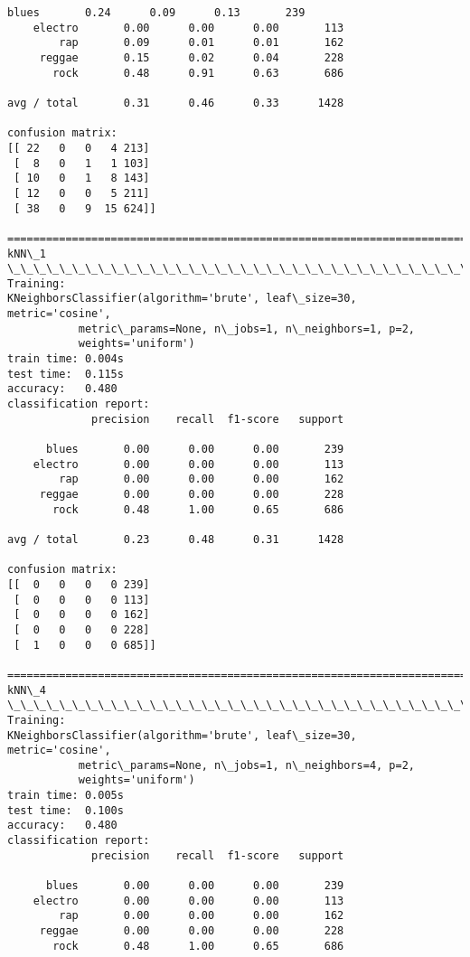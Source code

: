 \documentclass[11pt]{article}
\begin{document}
\begin{Verbatim}[commandchars=\\\{\}]
      blues       0.24      0.09      0.13       239
    electro       0.00      0.00      0.00       113
        rap       0.09      0.01      0.01       162
     reggae       0.15      0.02      0.04       228
       rock       0.48      0.91      0.63       686

avg / total       0.31      0.46      0.33      1428

confusion matrix:
[[ 22   0   0   4 213]
 [  8   0   1   1 103]
 [ 10   0   1   8 143]
 [ 12   0   0   5 211]
 [ 38   0   9  15 624]]

================================================================================
kNN\_1
\_\_\_\_\_\_\_\_\_\_\_\_\_\_\_\_\_\_\_\_\_\_\_\_\_\_\_\_\_\_\_\_\_\_\_\_\_\_\_\_\_\_\_\_\_\_\_\_\_\_\_\_\_\_\_\_\_\_\_\_\_\_\_\_\_\_\_\_\_\_\_\_\_\_\_\_\_\_\_\_
Training: 
KNeighborsClassifier(algorithm='brute', leaf\_size=30, metric='cosine',
           metric\_params=None, n\_jobs=1, n\_neighbors=1, p=2,
           weights='uniform')
train time: 0.004s
test time:  0.115s
accuracy:   0.480
classification report:
             precision    recall  f1-score   support

      blues       0.00      0.00      0.00       239
    electro       0.00      0.00      0.00       113
        rap       0.00      0.00      0.00       162
     reggae       0.00      0.00      0.00       228
       rock       0.48      1.00      0.65       686

avg / total       0.23      0.48      0.31      1428

confusion matrix:
[[  0   0   0   0 239]
 [  0   0   0   0 113]
 [  0   0   0   0 162]
 [  0   0   0   0 228]
 [  1   0   0   0 685]]

================================================================================
kNN\_4
\_\_\_\_\_\_\_\_\_\_\_\_\_\_\_\_\_\_\_\_\_\_\_\_\_\_\_\_\_\_\_\_\_\_\_\_\_\_\_\_\_\_\_\_\_\_\_\_\_\_\_\_\_\_\_\_\_\_\_\_\_\_\_\_\_\_\_\_\_\_\_\_\_\_\_\_\_\_\_\_
Training: 
KNeighborsClassifier(algorithm='brute', leaf\_size=30, metric='cosine',
           metric\_params=None, n\_jobs=1, n\_neighbors=4, p=2,
           weights='uniform')
train time: 0.005s
test time:  0.100s
accuracy:   0.480
classification report:
             precision    recall  f1-score   support

      blues       0.00      0.00      0.00       239
    electro       0.00      0.00      0.00       113
        rap       0.00      0.00      0.00       162
     reggae       0.00      0.00      0.00       228
       rock       0.48      1.00      0.65       686


\end{Verbatim}
\end{document}
